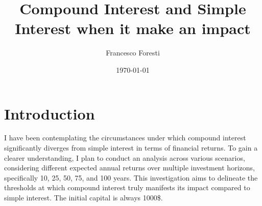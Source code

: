 \documentclass[11pt]{article}
\title{Compound Interest and Simple Interest when it make an impact}
\author{Francesco Foresti}
\date{\today}
\begin{document}
\maketitle	
\tableofcontents

\newpage

\section{Introduction}

I have been contemplating the circumstances under which compound interest significantly diverges from simple interest in terms of financial returns.
\newline
To gain a clearer understanding, I plan to conduct an analysis across various scenarios, considering different expected annual returns over multiple investment horizons, specifically 10, 25, 50, 75, and 100 years. \newline
This investigation aims to delineate the thresholds at which compound interest truly manifests its impact compared to simple interest. \newline
The initial capital is always 1000\$.

\newpage
\end{document}
